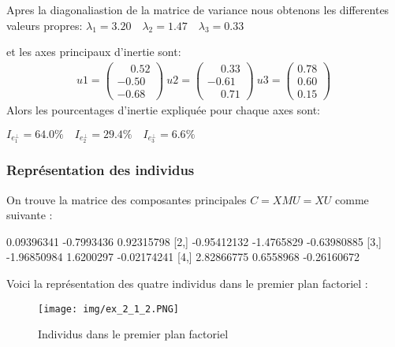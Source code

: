 \documentclass{article}
\begin{document}
\begin{multicols}{2}
    Apres la diagonaliastion de la matrice de variance nous obtenons les differentes valeurs propres:
    $\lambda_1 = 3.20 \quad \lambda_2 = 1.47 \quad \lambda_3 = 0.33$

    et les axes principaux d’inertie sont:
        \begin{gather*}
          u1 = \begin{pmatrix} \phantom{-}0.52  \\ -0.50 \\ -0.68 \end{pmatrix} \
          u2=  \begin{pmatrix} \phantom{-}0.33  \\ -0.61 \\ \phantom{-}0.71 \end{pmatrix} \
          u3=  \begin{pmatrix} 0.78  \\  0.60 \\0.15 \end{pmatrix} \
        \end{gather*}
    Alors les pourcentages d'inertie expliquée pour chaque axes sont:
    
    $I_{e_1^{\bot}} = 64.0\% \quad I_{e_2^{\bot}} = 29.4\% \quad I_{e_3^{\bot}} = 6.6\% $
    \subsubsection{Représentation des individus}
	
	On trouve la matrice des composantes principales $ C=XMU =XU $ comme suivante :
    \begin{mdframed}
\begin{footnotesize}
\begin{Schunk}
\begin{Soutput}
       [,1]       [,2]        [,3]
[1,]  0.09396341 -0.7993436  0.92315798
[2,] -0.95412132 -1.4765829 -0.63980885
[3,] -1.96850984  1.6200297 -0.02174241
[4,]  2.82866775  0.6558968 -0.26160672
\end{Soutput}
\end{Schunk}
\end{footnotesize}
    \end{mdframed}
    
    Voici la représentation des quatre individus dans le premier plan factoriel :
    \begin{figure}[H]
    	\centering
    	\texttt{[image: img/ex\_2\_1\_2.PNG]}
    	\caption{Individus dans le premier plan factoriel}
    	\label{fig:4 individus dans le premier plan factoriel}		
    \end{figure}
    


\end{multicols}
\end{document}
